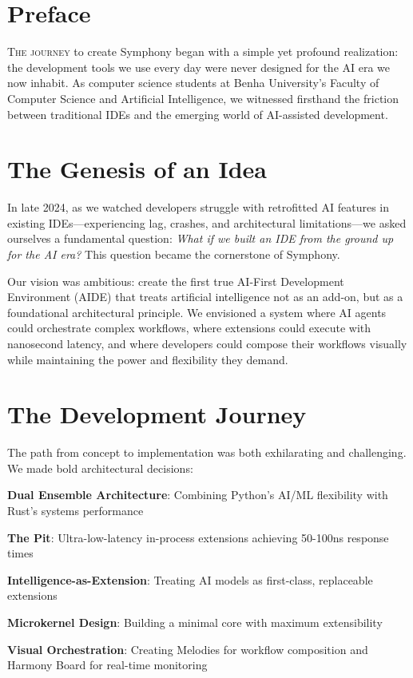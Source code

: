 
\section*{Preface}

\lettrine{T}{he journey} to create Symphony began with a simple yet profound realization: the development tools we use every day were never designed for the AI era we now inhabit. As computer science students at Benha University's Faculty of Computer Science and Artificial Intelligence, we witnessed firsthand the friction between traditional IDEs and the emerging world of AI-assisted development.

\section*{The Genesis of an Idea}

\begin{infobox}[title=The Spark of Innovation]
In late 2024, as we watched developers struggle with retrofitted AI features in existing IDEs—experiencing lag, crashes, and architectural limitations—we asked ourselves a fundamental question: \textit{What if we built an IDE from the ground up for the AI era?} This question became the cornerstone of Symphony.
\end{infobox}

Our vision was ambitious: create the first true AI-First Development Environment (AIDE) that treats artificial intelligence not as an add-on, but as a foundational architectural principle. We envisioned a system where AI agents could orchestrate complex workflows, where extensions could execute with nanosecond latency, and where developers could compose their workflows visually while maintaining the power and flexibility they demand.

\section*{The Development Journey}

The path from concept to implementation was both exhilarating and challenging. We made bold architectural decisions:

\begin{expandedlist}
    \item \textbf{Dual Ensemble Architecture}: Combining Python's AI/ML flexibility with Rust's systems performance
    \item \textbf{The Pit}: Ultra-low-latency in-process extensions achieving 50-100ns response times
    \item \textbf{Intelligence-as-Extension}: Treating AI models as first-class, replaceable extensions
    \item \textbf{Microkernel Design}: Building a minimal core with maximum extensibility
    \item \textbf{Visual Orchestration}: Creating Melodies for workflow composition and Harmony Board for real-time monitoring
\end{expandedlist}

